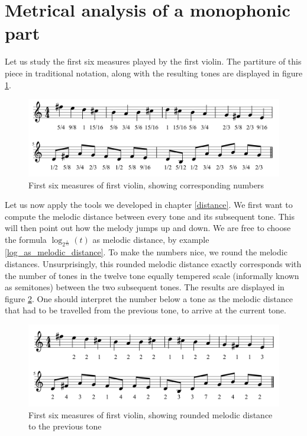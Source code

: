 \documentclass[a4paper]{book}
\theoremstyle{definition}
\begin{document}
\section{Metrical analysis of a monophonic part}
Let us study the first six measures played by the first violin. The partiture of this piece in traditional notation, along with the resulting tones are displayed in figure \ref{fig_first_violin_tones}.

\begin{figure}[H]
    \centering
    \includegraphics[scale=0.25]{figures/fig_first_violin_tones.png}
    \caption{First six measures of first violin, showing corresponding numbers}
    \label{fig_first_violin_tones}
\end{figure}

Let us now apply the tools we developed in chapter \ref{distance}.
We first want to compute the melodic distance between every tone and its subsequent tone.
This will then point out how the melody jumps up and down.
We are free to choose the formula $\log_{2^{\frac{1}{12}}}(t)$ as melodic distance, by example \ref{log_as_melodic_distance}.
To make the numbers nice, we round the melodic distances.
Unsurprisingly, this rounded melodic distance exactly corresponds with the number of tones in the twelve tone equally tempered scale (informally known as semitones) between the two subsequent tones.
The results are displayed in figure \ref{fig_first_violin_melodic_distance}.
One should interpret the number below a tone as the melodic distance that had to be travelled from the previous tone, to arrive at the current tone.

\begin{figure}[H]
    \centering
    \includegraphics[scale=0.25]{figures/fig_first_violin_melodic_distance.png}
    \caption{First six measures of first violin, showing rounded melodic distance to the previous tone}
    \label{fig_first_violin_melodic_distance}
\end{figure}
\end{document}
